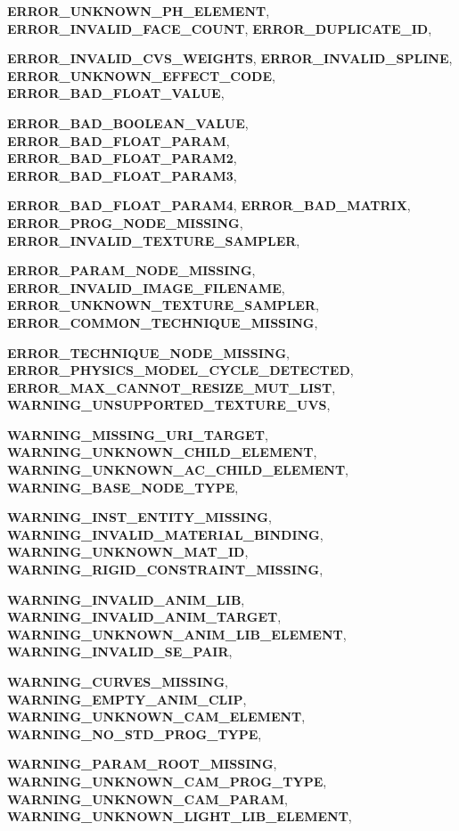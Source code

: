 \begin{DoxyCompactItemize}
{\bfseries ERROR\_\-UNKNOWN\_\-PH\_\-ELEMENT}, 
{\bfseries ERROR\_\-INVALID\_\-FACE\_\-COUNT}, 
{\bfseries ERROR\_\-DUPLICATE\_\-ID}, 
\par
{\bfseries ERROR\_\-INVALID\_\-CVS\_\-WEIGHTS}, 
{\bfseries ERROR\_\-INVALID\_\-SPLINE}, 
{\bfseries ERROR\_\-UNKNOWN\_\-EFFECT\_\-CODE}, 
{\bfseries ERROR\_\-BAD\_\-FLOAT\_\-VALUE}, 
\par
{\bfseries ERROR\_\-BAD\_\-BOOLEAN\_\-VALUE}, 
{\bfseries ERROR\_\-BAD\_\-FLOAT\_\-PARAM}, 
{\bfseries ERROR\_\-BAD\_\-FLOAT\_\-PARAM2}, 
{\bfseries ERROR\_\-BAD\_\-FLOAT\_\-PARAM3}, 
\par
{\bfseries ERROR\_\-BAD\_\-FLOAT\_\-PARAM4}, 
{\bfseries ERROR\_\-BAD\_\-MATRIX}, 
{\bfseries ERROR\_\-PROG\_\-NODE\_\-MISSING}, 
{\bfseries ERROR\_\-INVALID\_\-TEXTURE\_\-SAMPLER}, 
\par
{\bfseries ERROR\_\-PARAM\_\-NODE\_\-MISSING}, 
{\bfseries ERROR\_\-INVALID\_\-IMAGE\_\-FILENAME}, 
{\bfseries ERROR\_\-UNKNOWN\_\-TEXTURE\_\-SAMPLER}, 
{\bfseries ERROR\_\-COMMON\_\-TECHNIQUE\_\-MISSING}, 
\par
{\bfseries ERROR\_\-TECHNIQUE\_\-NODE\_\-MISSING}, 
{\bfseries ERROR\_\-PHYSICS\_\-MODEL\_\-CYCLE\_\-DETECTED}, 
{\bfseries ERROR\_\-MAX\_\-CANNOT\_\-RESIZE\_\-MUT\_\-LIST}, 
{\bfseries WARNING\_\-UNSUPPORTED\_\-TEXTURE\_\-UVS}, 
\par
{\bfseries WARNING\_\-MISSING\_\-URI\_\-TARGET}, 
{\bfseries WARNING\_\-UNKNOWN\_\-CHILD\_\-ELEMENT}, 
{\bfseries WARNING\_\-UNKNOWN\_\-AC\_\-CHILD\_\-ELEMENT}, 
{\bfseries WARNING\_\-BASE\_\-NODE\_\-TYPE}, 
\par
{\bfseries WARNING\_\-INST\_\-ENTITY\_\-MISSING}, 
{\bfseries WARNING\_\-INVALID\_\-MATERIAL\_\-BINDING}, 
{\bfseries WARNING\_\-UNKNOWN\_\-MAT\_\-ID}, 
{\bfseries WARNING\_\-RIGID\_\-CONSTRAINT\_\-MISSING}, 
\par
{\bfseries WARNING\_\-INVALID\_\-ANIM\_\-LIB}, 
{\bfseries WARNING\_\-INVALID\_\-ANIM\_\-TARGET}, 
{\bfseries WARNING\_\-UNKNOWN\_\-ANIM\_\-LIB\_\-ELEMENT}, 
{\bfseries WARNING\_\-INVALID\_\-SE\_\-PAIR}, 
\par
{\bfseries WARNING\_\-CURVES\_\-MISSING}, 
{\bfseries WARNING\_\-EMPTY\_\-ANIM\_\-CLIP}, 
{\bfseries WARNING\_\-UNKNOWN\_\-CAM\_\-ELEMENT}, 
{\bfseries WARNING\_\-NO\_\-STD\_\-PROG\_\-TYPE}, 
\par
{\bfseries WARNING\_\-PARAM\_\-ROOT\_\-MISSING}, 
{\bfseries WARNING\_\-UNKNOWN\_\-CAM\_\-PROG\_\-TYPE}, 
{\bfseries WARNING\_\-UNKNOWN\_\-CAM\_\-PARAM}, 
{\bfseries WARNING\_\-UNKNOWN\_\-LIGHT\_\-LIB\_\-ELEMENT}, 

\end{DoxyCompactItemize}
